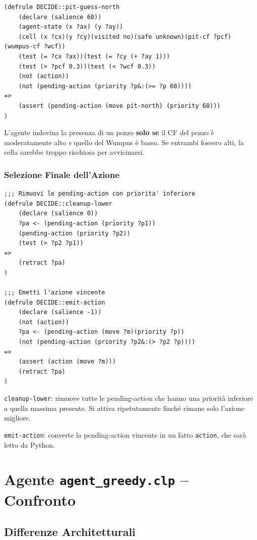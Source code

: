 \documentclass[12pt,a4paper]{article}
\begin{document}
\begin{lstlisting}
(defrule DECIDE::pit-guess-north
    (declare (salience 60))
    (agent-state (x ?ax) (y ?ay))
    (cell (x ?cx)(y ?cy)(visited no)(safe unknown)(pit-cf ?pcf)(wumpus-cf ?wcf))
    (test (= ?cx ?ax))(test (= ?cy (+ ?ay 1)))
    (test (> ?pcf 0.3))(test (< ?wcf 0.3))
    (not (action))
    (not (pending-action (priority ?p&:(>= ?p 60))))
=>
    (assert (pending-action (move pit-north) (priority 60)))
)
\end{lstlisting}

L'agente indovina la presenza di un pozzo \textbf{solo se} il CF del pozzo è
moderatamente alto \emph{e} quello del Wumpus è basso. Se entrambi fossero
alti, la cella sarebbe troppo rischiosa per avvicinarsi.

\subsubsection{Selezione Finale dell'Azione}

\begin{lstlisting}
;;; Rimuovi le pending-action con priorita' inferiore
(defrule DECIDE::cleanup-lower
    (declare (salience 0))
    ?pa <- (pending-action (priority ?p1))
    (pending-action (priority ?p2))
    (test (> ?p2 ?p1))
=>
    (retract ?pa)
)

;;; Emetti l'azione vincente
(defrule DECIDE::emit-action
    (declare (salience -1))
    (not (action))
    ?pa <- (pending-action (move ?m)(priority ?p))
    (not (pending-action (priority ?p2&:(> ?p2 ?p))))
=>
    (assert (action (move ?m)))
    (retract ?pa)
)
\end{lstlisting}

\texttt{cleanup-lower}: rimuove tutte le pending-action che hanno una priorità
inferiore a quella massima presente. Si attiva ripetutamente finché rimane
solo l'azione migliore.

\texttt{emit-action}: converte la pending-action vincente in un fatto
\texttt{action}, che sarà letto da Python.

\section{Agente \texttt{agent\_greedy.clp} -- Confronto}

\subsection{Differenze Architetturali}
\end{document}
